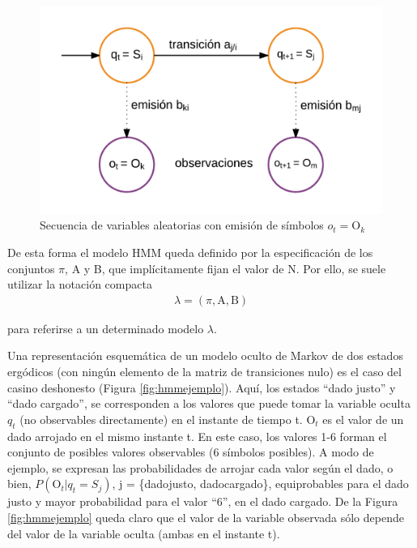 \begin{figure}[!htp]
\centering
\captionsetup{width=.6\linewidth}
\includegraphics[width=.6\linewidth]{images/emision_hmm.png}
\caption{Secuencia de variables aleatorias con emisión de símbolos $o_t=\mathrm{O}_k$}
\label{fig:emisioneshmm}
\end{figure}

De esta forma el modelo HMM queda definido por la especificación de los conjuntos $\pi$, A y B, que implícitamente fijan el valor de N. Por ello, se suele utilizar la notación compacta
\begin{align*}
\lambda = (\pi,\mathrm{A},\mathrm{B})    
\end{align*}

para referirse a un determinado modelo $\lambda$.

Una representación esquemática de un modelo oculto de Markov de dos estados ergódicos (con ningún elemento de la matriz de transiciones nulo) es el caso del casino deshonesto (Figura \ref{fig:hmmejemplo}). Aquí, los estados “dado justo” y “dado cargado”, se corresponden a los valores que puede tomar la variable oculta $q_t$ (no observables directamente) en el instante de tiempo t. $\mathrm{O}_t$ es el valor de un dado arrojado en el mismo instante t. En este caso, los valores 1-6 forman el conjunto de posibles valores observables (6 símbolos posibles). A modo de ejemplo, se expresan las probabilidades de arrojar cada valor según el dado, o bien, $P(\mathrm{O}_t|q_t=S_j)$, j = \{dadojusto, dadocargado\}, equiprobables para el dado justo y mayor probabilidad para el valor “6”, en el dado cargado. De la Figura \ref{fig:hmmejemplo} queda claro que el valor de la variable observada sólo depende del valor de la variable oculta (ambas en el instante t).

